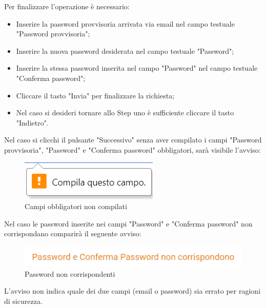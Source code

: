 \documentclass{article}
\begin{document}
Per finalizzare l'operazione è necessario:
\begin{itemize}
    \item Inserire la password provvisoria arrivata via email nel campo testuale "Password provvisoria";
    \item Inserire la nuova password desiderata nel campo testuale "Password";
    \item Inserire la stessa password inserita nel campo "Password" nel campo testuale "Conferma password";
    \item Cliccare il tasto "Invia" per finalizzare la richiesta;
    \item Nel caso si desideri tornare allo Step uno è sufficiente cliccare il tasto "Indietro".
\end{itemize}
Nel caso si clicchi il pulsante "Successivo" senza aver compilato i campi "Password provvisoria", "Password" e "Conferma password" obbligatori, sarà visibile l'avviso:
\begin{figure}[H]
      \centering
      \includegraphics{documenti/Screenshot manuale utente/compila questo campo.png}
      \caption{Campi obbligatori non compilati}
      \label{campiobb}
    \end{figure}
Nel caso le password inserite nei campi "Password" e "Conferma password" non corrispondano comparirà il seguente avviso:
\begin{figure}[H]
      \centering
      \includegraphics{documenti/Screenshot manuale utente/password non corrispondono.png}
      \caption{Password non corrispondenti}
      \label{passdiverse}
    \end{figure}
L'avviso non indica quale dei due campi (email o password) sia errato per ragioni di sicurezza.
\end{document}
